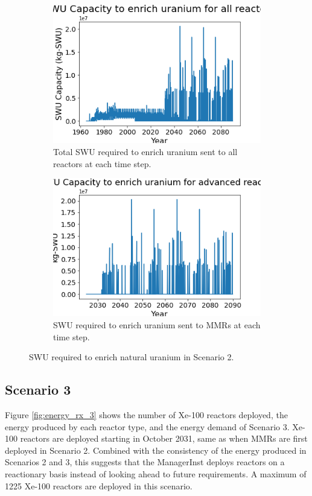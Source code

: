 \begin{figure}
    \centering
    \begin{subfigure}{0.4\textwidth}
        \centering
        \includegraphics[scale=0.3]{figures/totalswu_scenarios_2.png}
        \caption{Total \gls{SWU} required to enrich uranium sent to all reactors at each time step.}
        \label{fig:totalswu_2}
    \end{subfigure}
    \begin{subfigure}{0.4\textwidth}
        \centering
        \includegraphics[scale=0.3]{figures/haleuSWU_scenarios_2.png}
        \caption{\gls{SWU} required to enrich uranium sent to \glspl{MMR} at each time step.}
        \label{fig:haleuswu_2}
    \end{subfigure}
    \caption{\gls{SWU} required to enrich natural uranium in Scenario 2.}
    \label{fig:swu_2}
\end{figure}

\subsection{Scenario 3}
Figure \ref{fig:energy_rx_3} shows the number of Xe-100 reactors deployed, 
the energy produced by each reactor type, and the energy demand of Scenario 3. 
Xe-100 reactors are deployed starting in October 2031, same as when \glspl{MMR}
are first deployed in Scenario 2. Combined with the consistency of the energy 
produced in Scenarios 2 and 3, this suggests that the \Cycamore ManagerInst 
deploys reactors on a reactionary basis instead of looking ahead to future 
requirements. A maximum of 1225 Xe-100 reactors are deployed in this scenario.

